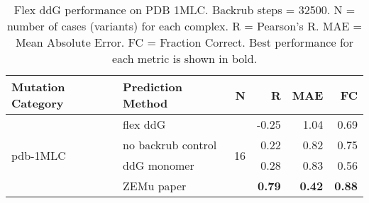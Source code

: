 \begin{table}
  \begin{tabular}{llrrrr}
\toprule
Mutation Category &   Prediction Method &   N &     R &  MAE &   FC \\
\midrule
 \multirow{ 4}{*}{pdb-1MLC} & flex ddG & \multirow{ 4}{*}{16} & -0.25 & 1.04 & 0.69  \\
 & no backrub control & & 0.22 & 0.82 & 0.75  \\
 & ddG monomer & & 0.28 & 0.83 & 0.56  \\
 & ZEMu paper & & \textbf{0.79} & \textbf{0.42} & \textbf{0.88}  \\
\bottomrule
\end{tabular}
  \caption[Flex ddG performance on PDB 1MLC]{
    Flex ddG performance on PDB 1MLC. Backrub steps = 32500. N = number of cases (variants) for each complex. R = Pearson's R. MAE = Mean Absolute Error. FC = Fraction Correct. Best performance for each metric is shown in bold.
  } \label{tab:table-pdb-1MLC}
\end{table}

